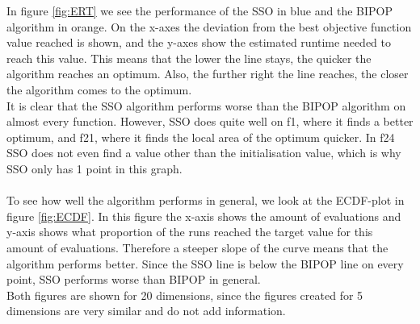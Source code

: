 \documentclass[runningheads]{llncs}
\begin{document}
In figure \ref{fig:ERT} we see the performance of the SSO in blue and the BIPOP algorithm in orange. On the x-axes the deviation from the best objective function value reached is shown, and the y-axes show the estimated runtime needed to reach this value. This means that the lower the line stays, the quicker the algorithm reaches an optimum. Also, the further right the line reaches, the closer the algorithm comes to the optimum.\\
It is clear that the SSO algorithm performs worse than the BIPOP algorithm on almost every function. However, SSO does quite well on f1, where it finds a better optimum, and f21, where it finds the local area of the optimum quicker. In f24 SSO does not even find a value other than the initialisation value, which is why SSO only has 1 point in this graph.\\
\\
To see how well the algorithm performs in general, we look at the ECDF-plot in figure \ref{fig:ECDF}. In this figure the x-axis shows the amount of evaluations and y-axis shows what proportion of the runs reached the target value for this amount of evaluations.
Therefore a steeper slope of the curve means that the algorithm performs better. Since the SSO line is below the BIPOP line on every point, SSO performs worse than BIPOP in general.\\
Both figures are shown for 20 dimensions, since the figures created for 5 dimensions are very similar and do not add information. \\
\end{document}
